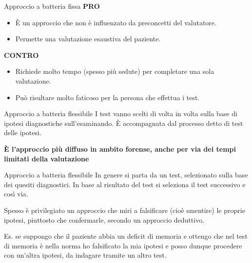 \documentclass[
  ignorenonframetext,
  aspectratio=169,
]{beamer}
\providecommand{\tightlist}{%
  \setlength{\itemsep}{0pt}\setlength{\parskip}{0pt}}
\begin{document}
\begin{frame}{Approccio a batteria fissa}
\label{approccio-a-batteria-fissa-1}
\textbf{PRO}

\begin{itemize}
\tightlist
\item
  È un approccio che non è influenzato da preconcetti del valutatore.
\item
  Permette una valutazione esaustiva del paziente.
\end{itemize}

\textbf{CONTRO}

\begin{itemize}
\tightlist
\item
  Richiede molto tempo (spesso più sedute) per completare una sola
  valutazione.
\item
  Può risultare molto faticoso per la persona che effettua i test.
\end{itemize}
\end{frame}

\begin{frame}{Approccio a batteria flessibile}
\label{approccio-a-batteria-flessibile}
I test vanno scelti di volta in volta sulla base di ipotesi diagnostiche
sull'esaminando. È accompagnata dal processo detto di test delle
ipotesi.

\textbf{È l'approccio più diffuso in ambito forense, anche per via dei
tempi limitati della valutazione}
\end{frame}

\begin{frame}{Approccio a batteria flessibile}
\label{approccio-a-batteria-flessibile-1}
In genere si parta da un test, selezionato sulla base dei quesiti
diagnostici. In base al risultato del test si seleziona il test
successivo e così via.

Spesso è privilegiato un approccio che miri a falsificare (cioè
smentire) le proprie ipotesi, piuttosto che confermarle, secondo un
approccio deduttivo.

Es. se suppongo che il paziente abbia un deficit di memoria e ottengo
che nel test di memoria è nella norma ho falsificato la mia ipotesi e
posso dunque procedere con un'altra ipotesi, da indagare tramite un
altro test.
\end{frame}
\end{document}

